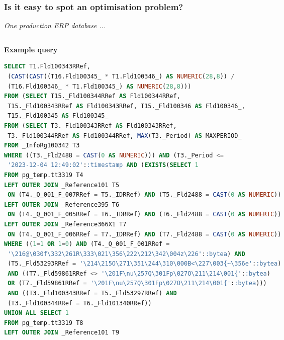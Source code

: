 \documentclass{beamer}
\begin{document}
\begin{frame}[fragile]\frametitle{Is it easy to spot an optimisation problem?}

\vspace{-0.4em}
	{\footnotesize\textit{One production ERP database ...}}

\begin{columns}[T]
\begin{column}{0.55\textwidth}
\begin{center}
	{\scriptsize\textbf{Example query}}\par\vspace{2pt}
\end{center}
\begin{tcolorbox}[enhanced, sharp corners=downhill, arc=1pt,
  colback=paper, colframe=mailrule, boxrule=0.4pt,
  left=3pt, right=3pt, top=3pt, bottom=2pt,
  before skip=0pt, after skip=2pt]
\begin{lstlisting}[language=SQL, breaklines=true, columns=fixed,
  basicstyle=\ttfamily\fontsize{3.1}{3.5}\selectfont,
  keywordstyle=\ttfamily]
SELECT T1.Fld100343RRef,
 (CAST(CAST((T16.Fld100345_ * T1.Fld100346_) AS NUMERIC(28,8)) /
 (T16.Fld100346_ * T1.Fld100345_) AS NUMERIC(28,8)))
FROM (SELECT T15._Fld100344RRef AS Fld100344RRef,
 T15._Fld100343RRef AS Fld100343RRef, T15._Fld100346 AS Fld100346_,
 T15._Fld100345 AS Fld100345_
FROM (SELECT T3._Fld100343RRef AS Fld100343RRef,
 T3._Fld100344RRef AS Fld100344RRef, MAX(T3._Period) AS MAXPERIOD_
FROM _InfoRg100342 T3
WHERE ((T3._Fld2488 = CAST(0 AS NUMERIC))) AND (T3._Period <=
 '2023-12-04 12:49:02'::timestamp AND (EXISTS(SELECT 1
FROM pg_temp.tt3319 T4
LEFT OUTER JOIN _Reference101 T5
 ON (T4._Q_001_F_007RRef = T5._IDRRef) AND (T5._Fld2488 = CAST(0 AS NUMERIC))
LEFT OUTER JOIN _Reference395 T6
 ON (T4._Q_001_F_005RRef = T6._IDRRef) AND (T6._Fld2488 = CAST(0 AS NUMERIC))
LEFT OUTER JOIN _Reference366X1 T7
 ON (T4._Q_001_F_006RRef = T7._IDRRef) AND (T7._Fld2488 = CAST(0 AS NUMERIC))
WHERE ((1=1 OR 1=0) AND (T4._Q_001_F_001RRef =
 '\216@\030f\332\261R\333\021\356\222\212\342\004z\226'::bytea) AND
 (T5._Fld53293RRef = '\214\215O\271\351\244\310\000B<\227\003{~\356e'::bytea)
 AND ((T7._Fld59861RRef <> '\201F\nu\257Q\301Fp\027O\211\214\001{'::bytea)
 OR (T7._Fld59861RRef = '\201F\nu\257Q\301Fp\027O\211\214\001{'::bytea)))
 AND ((T3._Fld100343RRef = T5._Fld53297RRef) AND
 (T3._Fld100344RRef = T6._Fld101340RRef))
UNION ALL SELECT 1
FROM pg_temp.tt3319 T8
LEFT OUTER JOIN _Reference101 T9

\end{lstlisting}
\end{tcolorbox}
\end{column}
\end{columns}
\end{frame}
\end{document}
